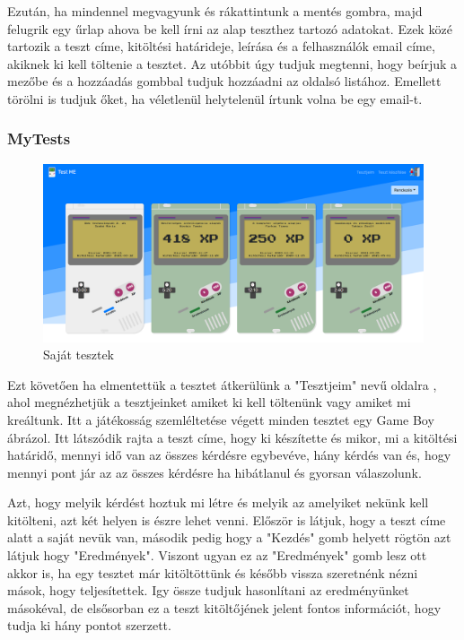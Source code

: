 Ezután, ha mindennel megvagyunk és rákattintunk a mentés gombra, majd felugrik egy űrlap  ahova be kell írni az alap teszthez tartozó adatokat. Ezek közé tartozik a teszt címe, kitöltési határideje, leírása és a felhasználók email címe, akiknek ki kell töltenie a tesztet. Az utóbbit úgy tudjuk megtenni, hogy beírjuk a mezőbe és a hozzáadás gombbal tudjuk hozzáadni az oldalsó listához. Emellett törölni is tudjuk őket, ha véletlenül helytelenül írtunk volna be egy email-t.

\subsubsection{MyTests}


\begin{figure}[H]
    \centering
    \includegraphics[width=\linewidth]{images/my_tests.png}
    \caption{Saját tesztek}
    \label{fig:my_tests}
\end{figure}

Ezt követően ha elmentettük a tesztet átkerülünk a "Tesztjeim" nevű oldalra , ahol megnézhetjük a tesztjeinket amiket ki kell töltenünk vagy amiket mi kreáltunk. Itt a játékosság szemléltetése végett minden tesztet egy Game Boy ábrázol. Itt látszódik rajta a teszt címe, hogy ki készítette és mikor, mi a kitöltési határidő, mennyi idő van az összes kérdésre egybevéve, hány kérdés van és, hogy mennyi pont jár az az összes kérdésre ha hibátlanul és gyorsan válaszolunk. \newline

Azt, hogy melyik kérdést hoztuk mi létre és melyik az amelyiket nekünk kell kitölteni, azt két helyen is észre lehet venni. Először is látjuk, hogy a teszt címe alatt a saját nevük van, második pedig hogy a "Kezdés" gomb helyett rögtön azt látjuk hogy "Eredmények". Viszont ugyan ez az "Eredmények" gomb lesz ott akkor is, ha egy tesztet már kitöltöttünk és később vissza szeretnénk nézni mások, hogy teljesítettek. Igy össze tudjuk hasonlítani az eredményünket másokéval, de elsősorban ez a teszt kitöltőjének jelent fontos információt, hogy tudja ki hány pontot szerzett. \newline

